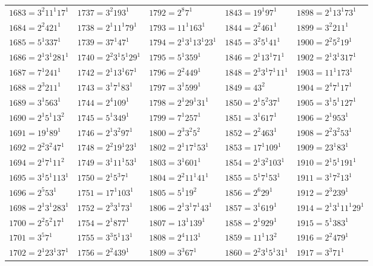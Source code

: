 {\begin{longtable}[c]{*{5}{l}}
$1683=3^{2}11^{1}17^{1}$&$1737=3^{2}193^{1}$&$1792=2^{8}7^{1}$&$1843=19^{1}97^{1}$&$1898=2^{1}13^{1}73^{1}$\\
$1684=2^{2}421^{1}$&$1738=2^{1}11^{1}79^{1}$&$1793=11^{1}163^{1}$&$1844=2^{2}461^{1}$&$1899=3^{2}211^{1}$\\
$1685=5^{1}337^{1}$&$1739=37^{1}47^{1}$&$1794=2^{1}3^{1}13^{1}23^{1}$&$1845=3^{2}5^{1}41^{1}$&$1900=2^{2}5^{2}19^{1}$\\
$1686=2^{1}3^{1}281^{1}$&$1740=2^{2}3^{1}5^{1}29^{1}$&$1795=5^{1}359^{1}$&$1846=2^{1}13^{1}71^{1}$&$1902=2^{1}3^{1}317^{1}$\\
$1687=7^{1}241^{1}$&$1742=2^{1}13^{1}67^{1}$&$1796=2^{2}449^{1}$&$1848=2^{3}3^{1}7^{1}11^{1}$&$1903=11^{1}173^{1}$\\
$1688=2^{3}211^{1}$&$1743=3^{1}7^{1}83^{1}$&$1797=3^{1}599^{1}$&$1849=43^{2}$&$1904=2^{4}7^{1}17^{1}$\\
$1689=3^{1}563^{1}$&$1744=2^{4}109^{1}$&$1798=2^{1}29^{1}31^{1}$&$1850=2^{1}5^{2}37^{1}$&$1905=3^{1}5^{1}127^{1}$\\
$1690=2^{1}5^{1}13^{2}$&$1745=5^{1}349^{1}$&$1799=7^{1}257^{1}$&$1851=3^{1}617^{1}$&$1906=2^{1}953^{1}$\\
$1691=19^{1}89^{1}$&$1746=2^{1}3^{2}97^{1}$&$1800=2^{3}3^{2}5^{2}$&$1852=2^{2}463^{1}$&$1908=2^{2}3^{2}53^{1}$\\
$1692=2^{2}3^{2}47^{1}$&$1748=2^{2}19^{1}23^{1}$&$1802=2^{1}17^{1}53^{1}$&$1853=17^{1}109^{1}$&$1909=23^{1}83^{1}$\\
$1694=2^{1}7^{1}11^{2}$&$1749=3^{1}11^{1}53^{1}$&$1803=3^{1}601^{1}$&$1854=2^{1}3^{2}103^{1}$&$1910=2^{1}5^{1}191^{1}$\\
$1695=3^{1}5^{1}113^{1}$&$1750=2^{1}5^{3}7^{1}$&$1804=2^{2}11^{1}41^{1}$&$1855=5^{1}7^{1}53^{1}$&$1911=3^{1}7^{2}13^{1}$\\
$1696=2^{5}53^{1}$&$1751=17^{1}103^{1}$&$1805=5^{1}19^{2}$&$1856=2^{6}29^{1}$&$1912=2^{3}239^{1}$\\
$1698=2^{1}3^{1}283^{1}$&$1752=2^{3}3^{1}73^{1}$&$1806=2^{1}3^{1}7^{1}43^{1}$&$1857=3^{1}619^{1}$&$1914=2^{1}3^{1}11^{1}29^{1}$\\
$1700=2^{2}5^{2}17^{1}$&$1754=2^{1}877^{1}$&$1807=13^{1}139^{1}$&$1858=2^{1}929^{1}$&$1915=5^{1}383^{1}$\\
$1701=3^{5}7^{1}$&$1755=3^{3}5^{1}13^{1}$&$1808=2^{4}113^{1}$&$1859=11^{1}13^{2}$&$1916=2^{2}479^{1}$\\
$1702=2^{1}23^{1}37^{1}$&$1756=2^{2}439^{1}$&$1809=3^{3}67^{1}$&$1860=2^{2}3^{1}5^{1}31^{1}$&$1917=3^{3}71^{1}$\\

\end{longtable}}
